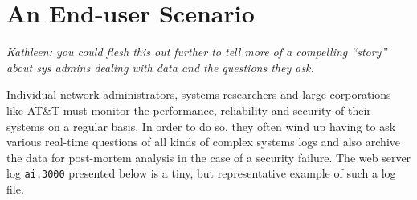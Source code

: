\documentclass{sig-alternate-sigmod08}
\begin{document}


\section{An End-user Scenario}

{\em Kathleen:  you could flesh this out further to tell more of a 
compelling ``story'' about sys admins dealing with data and the
questions they ask.}

Individual network administrators, systems researchers and large 
corporations like AT\&T must monitor the performance,
reliability and security of their systems on a regular basis.
In order to do so, they often wind up having to ask various real-time
questions of all kinds of complex systems logs and also archive the
data for post-mortem analysis in the case of a security failure.
The web server log {\tt ai.3000} presented below is a tiny, but
representative example of such a log file.
\end{document}
